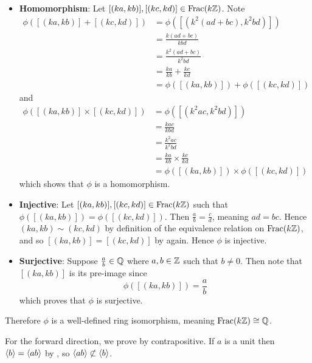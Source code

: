 \begin{questions}
\begin{partquestions}{\alph*}
\begin{itemize}
            \item \textbf{Homomorphism}: Let $[(ka, kb)], [(kc, kd)] \in \mathrm{Frac}(k\mathbb{Z})$. Note
            \begin{align*}
                \phi([(ka,kb)] + [(kc,kd)]) &= \phi([(k^2(ad+bc), k^2bd)])\\
                &= \frac{k(ad+bc)}{kbd}\\
                &= \frac{k^2(ad+bc)}{k^2bd}\\
                &= \frac {ka}{kb} + \frac {kc}{kd}\\
                &= \phi([(ka,kb)]) + \phi([(kc,kd)])
            \end{align*}
            and
            \begin{align*}
                \phi([(ka,kb)] \times [(kc,kd)]) &= \phi([(k^2ac, k^2bd)])\\
                &= \frac{kac}{kbd}\\
                &= \frac{k^2ac}{k^2bd}\\
                &= \frac {ka}{kb} \times \frac {kc}{kd}\\
                &= \phi([(ka,kb)]) \times \phi([(kc,kd)])
            \end{align*}
            which shows that $\phi$ is a homomorphism.

            \item \textbf{Injective}: Let $[(ka, kb)], [(kc, kd)] \in \mathrm{Frac}(k\mathbb{Z})$ such that $\phi([(ka, kb)]) = \phi([(kc, kd)])$. Then $\frac ab = \frac cd$, meaning $ad = bc$. Hence $(ka, kb) \mathrel{\sim} (kc, kd)$ by definition of the equivalence relation on $\mathrm{Frac}(k\mathbb{Z})$, and so $[(ka, kb)] = [(kc, kd)]$ by  again. Hence $\phi$ is injective.

            \item \textbf{Surjective}: Suppose $\frac ab \in \mathbb{Q}$ where $a, b \in \mathbb{Z}$ such that $b \neq 0$. Then note that $[(ka, kb)]$ is its pre-image since
            \[
                \phi([(ka, kb)]) = \frac ab
            \]
            which proves that $\phi$ is surjective.
        \end{itemize}
        Therefore $\phi$ is a well-defined ring isomorphism, meaning $\mathrm{Frac}(k\mathbb{Z}) \cong \mathbb{Q}$.
    \end{partquestions}

    \item For the forward direction, we prove by contrapositive. If $a$ is a unit then $\left\langle b\right\rangle = \left\langle ab\right\rangle$ by , so $\left\langle ab\right\rangle \not\subset \left\langle b\right\rangle$.


\end{questions}
